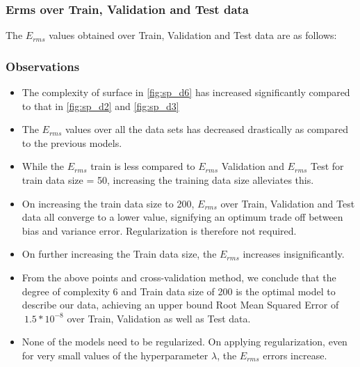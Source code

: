 \documentclass[12pt,a4paper]{article}
\begin{document}
\subsubsection{Erms over Train, Validation and Test data}
The $E_{rms}$ values obtained over Train, Validation and Test data are as follows: 
\break



\subsubsection{Observations}
\begin{itemize}
    \itemsep0em
    \item The complexity of surface in \autoref{fig:sp_d6} has increased significantly compared to that in \autoref{fig:sp_d2} and \autoref{fig:sp_d3}
    \item The $E_{rms}$ values over all the data sets has decreased drastically as compared to the previous models.
    \item While the $E_{rms}$ train is less compared to $E_{rms}$ Validation and $E_{rms}$ Test for train data size = 50, increasing the training data size alleviates this. 
    \item On increasing the train data size to 200, $E_{rms}$ over Train, Validation and Test data all converge to a lower value, signifying an optimum trade off between bias and variance error. Regularization is therefore not required.
    \item On further increasing the Train data size, the $E_{rms}$ increases insignificantly. 
    \item From the above points and cross-validation method, we conclude that the degree of complexity 6 and Train data size of 200 is the optimal model to describe our data, achieving an upper bound Root Mean Squared Error of $~1.5*10^{-8}$ over Train, Validation as well as Test data.
    \item None of the models need to be regularized. On applying regularization, even for very small values of the hyperparameter $\lambda$, the $E_{rms}$ errors increase. 
\end{itemize}
\end{document}
